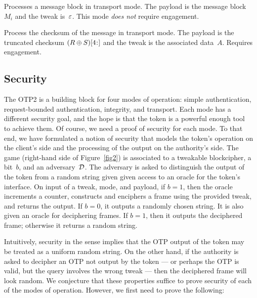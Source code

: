%
Processes a message block in transport mode. The payload is the message
block~$M_i$ and the tweak is~$\varepsilon$. This mode \emph{does not} require
engagement.

%
Process the checksum of the message in transport mode. The payload is the
truncated checksum $\substr({(R\xor S)},4,)$ and the tweak is the associated
data~$A$. Requires engagement.
%
\fi

\subsection{Security}
The OTP2 is a building block for four modes of operation: simple authentication,
request-bounded authentication, integrity, and transport. Each mode has a
different security goal, and the hope is that the token is a powerful enough
tool to achieve them.
%
Of course, we need a proof of security for each mode. To that end, we have
formulated a notion of security that models the token's operation on the client's
side and the processing of the output on the authority's side.
%
The \otpsec game (right-hand side of Figure~\ref{fig2}) is associated to a
tweakable blockcipher, a bit~$b$, and an adversary~$\mathcal{D}$. The adversary is
asked to distinguish the output of the token from a random string given
given access to an oracle for the token's  interface.  On input of
a tweak, mode, and payload, if $b=1$, then the oracle increments a counter,
constructs and enciphers a frame using the provided tweak, and returns the
output. If $b=0$, it outputs a randomly chosen string. It is also given an
oracle for deciphering frames. If $b=1$, then it outputs the deciphered frame;
otherwise it returns a random string.

Intuitively, security in the \otpsec sense implies that the OTP output of the
token may be treated as a uniform random string. On the other hand, if the
authority is asked to decipher an OTP not output by the token --- or perhaps the
OTP is valid, but the query involves the wrong tweak --- then the deciphered
frame will look random. We conjecture that these properties suffice to prove
security of each of the modes of operation.
%
%
However, we first need to prove the following:

